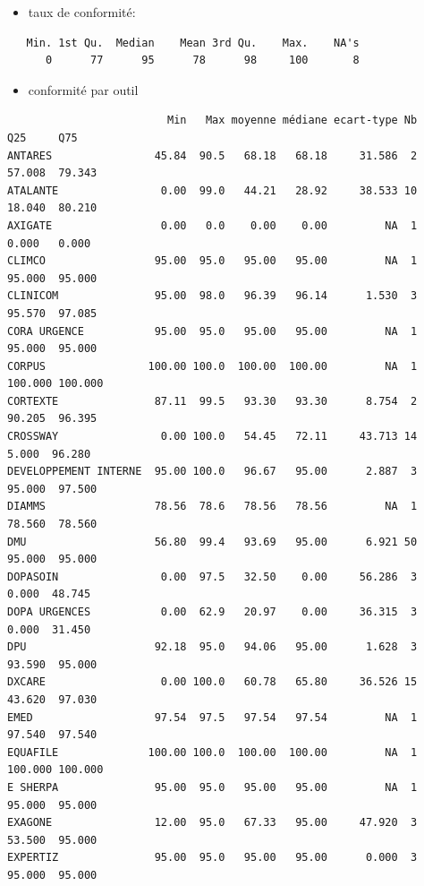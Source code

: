 \documentclass[]{article}
\begin{document}
\begin{itemize}
\itemsep1pt\parskip0pt
\item
  taux de conformité:
\end{itemize}

\begin{verbatim}
   Min. 1st Qu.  Median    Mean 3rd Qu.    Max.    NA's 
      0      77      95      78      98     100       8 
\end{verbatim}

\begin{itemize}
\itemsep1pt\parskip0pt
\item
  conformité par outil
\end{itemize}

\begin{verbatim}
                         Min   Max moyenne médiane ecart-type Nb     Q25     Q75
ANTARES                45.84  90.5   68.18   68.18     31.586  2  57.008  79.343
ATALANTE                0.00  99.0   44.21   28.92     38.533 10  18.040  80.210
AXIGATE                 0.00   0.0    0.00    0.00         NA  1   0.000   0.000
CLIMCO                 95.00  95.0   95.00   95.00         NA  1  95.000  95.000
CLINICOM               95.00  98.0   96.39   96.14      1.530  3  95.570  97.085
CORA URGENCE           95.00  95.0   95.00   95.00         NA  1  95.000  95.000
CORPUS                100.00 100.0  100.00  100.00         NA  1 100.000 100.000
CORTEXTE               87.11  99.5   93.30   93.30      8.754  2  90.205  96.395
CROSSWAY                0.00 100.0   54.45   72.11     43.713 14   5.000  96.280
DEVELOPPEMENT INTERNE  95.00 100.0   96.67   95.00      2.887  3  95.000  97.500
DIAMMS                 78.56  78.6   78.56   78.56         NA  1  78.560  78.560
DMU                    56.80  99.4   93.69   95.00      6.921 50  95.000  95.000
DOPASOIN                0.00  97.5   32.50    0.00     56.286  3   0.000  48.745
DOPA URGENCES           0.00  62.9   20.97    0.00     36.315  3   0.000  31.450
DPU                    92.18  95.0   94.06   95.00      1.628  3  93.590  95.000
DXCARE                  0.00 100.0   60.78   65.80     36.526 15  43.620  97.030
EMED                   97.54  97.5   97.54   97.54         NA  1  97.540  97.540
EQUAFILE              100.00 100.0  100.00  100.00         NA  1 100.000 100.000
E SHERPA               95.00  95.0   95.00   95.00         NA  1  95.000  95.000
EXAGONE                12.00  95.0   67.33   95.00     47.920  3  53.500  95.000
EXPERTIZ               95.00  95.0   95.00   95.00      0.000  3  95.000  95.000

\end{verbatim}
\end{document}

